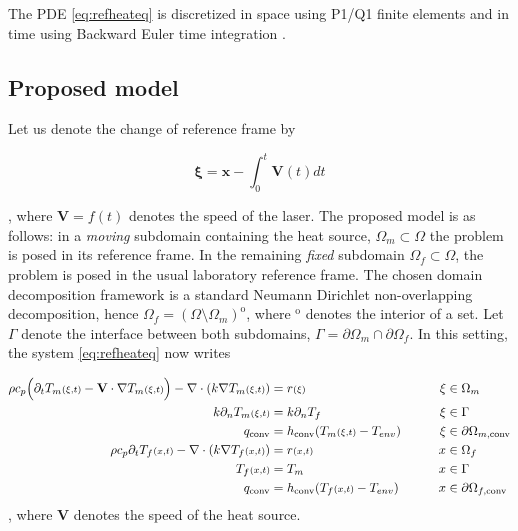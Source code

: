 The PDE \ref{eq:refheateq} is discretized in space using P1/Q1
finite elements and in time using Backward Euler time integration
\cite{Puso2023}.\par

\subsection{Proposed model}

Let us denote the change of reference frame by

$$
\mathbf{\xi} = \mathbf{x} - \int_0^t \mathbf{V}(t) dt
$$

, where $\mathbf{V} = f(t)$ denotes the
speed of the laser.
The proposed model is as follows:
in a \textit{moving} subdomain containing the heat source,
$\Omega_m \subset \Omega$
the problem is posed in its reference frame.
In the remaining
\textit{fixed} subdomain $\Omega_f \subset \Omega$,
the problem is posed
in the usual laboratory reference frame.
The chosen domain decomposition framework is
a standard Neumann Dirichlet non-overlapping decomposition,
hence $\Omega_f = (\Omega \setminus \Omega_m)^{\mathrm{o}}$,
where ${}^{\mathrm{o}}$ denotes the interior of a set. Let
$\Gamma$ denote the interface between both subdomains,
$\Gamma = \partial \Omega_m \cap \partial \Omega_f$. In this
setting, the system \ref{eq:refheateq} now writes 

\begin{align}
  \rho c_p \Big( \partial_t T_m{\scriptstyle (\xi, t)} - \mathbf{V} \cdot \nabla T_m{\scriptstyle (\xi, t)} \Big) -
  \nabla \cdot ( k \nabla T_m{\scriptstyle (\xi, t)}) &= r{\scriptstyle (\xi)}  &\xi &\in \Omega_m \label{eq:pdeddm} \\
  k \partial_n T_m{\scriptstyle (\xi, t)} &= k \partial_n T_f  &\xi &\in \Gamma \notag\\
  q_{\textrm{conv}} &= h_{\textrm{conv}} ( T_m{\scriptstyle(\xi,t)} - T_{env} ) \qquad &\xi &\in \partial \Omega_{m, \textrm{conv}}\notag\\
  \rho c_p \partial_t T_f{\scriptstyle (x, t)} - \nabla \cdot (k \nabla T_f{\scriptstyle (x, t)}) &= r{\scriptstyle (x, t)} \qquad &x &\in \Omega_f \label{eq:pdeddf} \\
  T_f{\scriptstyle (x, t)} &= T_m \qquad &x &\in \Gamma \notag\\
  q_{\textrm{conv}} &= h_{\textrm{conv}} ( T_f{\scriptstyle(x,t)} - T_{env} ) \qquad &x &\in \partial \Omega_{f, \textrm{conv}}\notag
\end{align}
, where $\mathbf{V}$ denotes the speed of the heat source.

